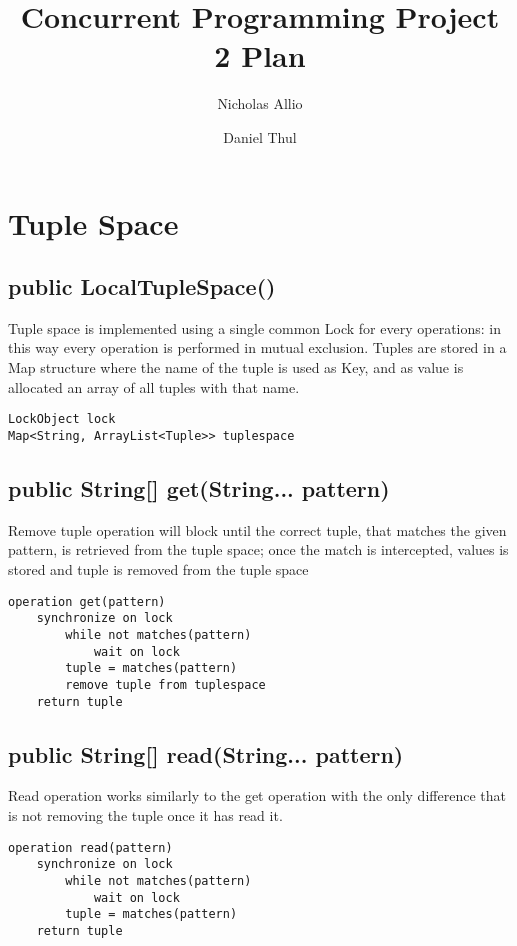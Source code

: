 \documentclass[10pt,a4paper]{article}
\author{Nicholas Allio \and Daniel Thul}
\title{Concurrent Programming Project 2 Plan}
\begin{document}
\maketitle

\section{Tuple Space}

\subsection{public LocalTupleSpace()}

Tuple space is implemented using a single common Lock for every operations: in this way every operation is performed in mutual exclusion.
Tuples are stored in a Map structure where the name of the tuple is used as Key, and as value is allocated an array of all tuples with that name.

\begin{verbatim}
LockObject lock
Map<String, ArrayList<Tuple>> tuplespace
\end{verbatim}

\subsection{public String[] get(String... pattern)}

Remove tuple operation will block until the correct tuple, that matches the given pattern, is retrieved from the tuple space; once the match is intercepted, values is stored and tuple is removed from the tuple space

\begin{verbatim}
operation get(pattern)
	synchronize on lock
		while not matches(pattern)
			wait on lock
		tuple = matches(pattern)
		remove tuple from tuplespace
	return tuple
\end{verbatim}

\subsection{public String[] read(String... pattern)}

Read operation works similarly to the get operation with the only difference that is not removing the tuple once it has read it.

\begin{verbatim}
operation read(pattern)
	synchronize on lock
		while not matches(pattern)
			wait on lock
		tuple = matches(pattern)
	return tuple
\end{verbatim}
\end{document}
